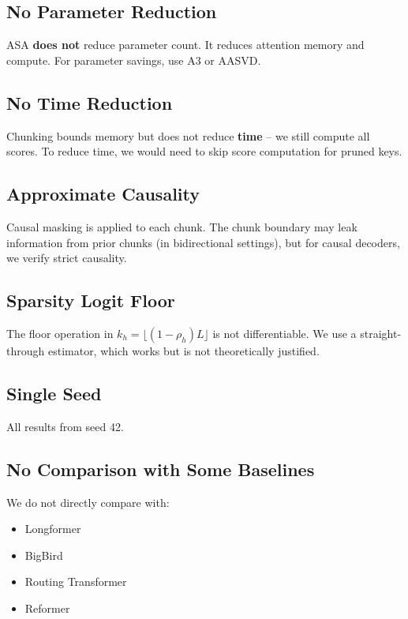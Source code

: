 \subsection{No Parameter Reduction}

ASA \textbf{does not} reduce parameter count. It reduces attention memory and 
compute. For parameter savings, use A3 or AASVD.

\subsection{No Time Reduction}

Chunking bounds memory but does not reduce \textbf{time} -- we still compute all 
scores. To reduce time, we would need to skip score computation for pruned 
keys.

\subsection{Approximate Causality}

Causal masking is applied to each chunk. The chunk boundary may leak 
information from prior chunks (in bidirectional settings), but for causal 
decoders, we verify strict causality.

\subsection{Sparsity Logit Floor}

The floor operation in $k_h = \lfloor (1 - \rho_h) L \rfloor$ is not 
differentiable. We use a straight-through estimator, which works but is 
not theoretically justified.

\subsection{Single Seed}

All results from seed 42.

\subsection{No Comparison with Some Baselines}

We do not directly compare with:
\begin{itemize}
\item Longformer
\item BigBird
\item Routing Transformer
\item Reformer

\end{itemize}
